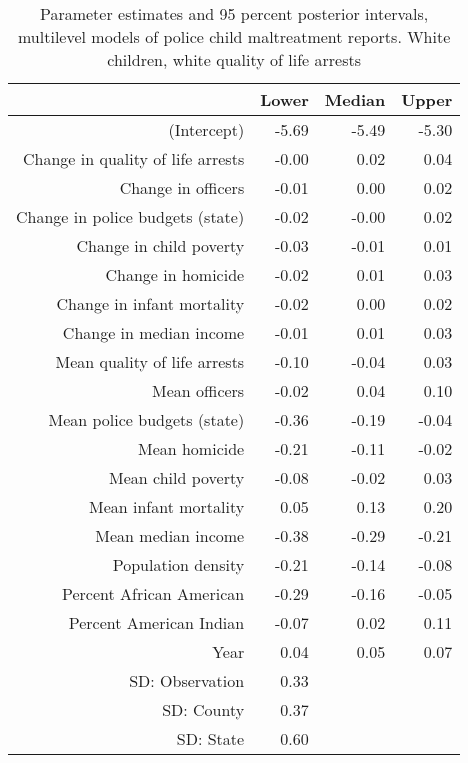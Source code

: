 \begin{table}[ht]
\centering
\begin{tabular}{rrrr}
  \hline
 & Lower & Median & Upper \\ 
  \hline
(Intercept) & -5.69 & -5.49 & -5.30 \\ 
  Change in quality of life arrests & -0.00 & 0.02 & 0.04 \\ 
  Change in officers & -0.01 & 0.00 & 0.02 \\ 
  Change in police budgets (state) & -0.02 & -0.00 & 0.02 \\ 
  Change in child poverty & -0.03 & -0.01 & 0.01 \\ 
  Change in homicide & -0.02 & 0.01 & 0.03 \\ 
  Change in infant mortality & -0.02 & 0.00 & 0.02 \\ 
  Change in median income & -0.01 & 0.01 & 0.03 \\ 
  Mean quality of life arrests & -0.10 & -0.04 & 0.03 \\ 
  Mean officers & -0.02 & 0.04 & 0.10 \\ 
  Mean police budgets (state) & -0.36 & -0.19 & -0.04 \\ 
  Mean homicide & -0.21 & -0.11 & -0.02 \\ 
  Mean child poverty & -0.08 & -0.02 & 0.03 \\ 
  Mean infant mortality & 0.05 & 0.13 & 0.20 \\ 
  Mean median income & -0.38 & -0.29 & -0.21 \\ 
  Population density & -0.21 & -0.14 & -0.08 \\ 
  Percent African American & -0.29 & -0.16 & -0.05 \\ 
  Percent American Indian & -0.07 & 0.02 & 0.11 \\ 
  Year & 0.04 & 0.05 & 0.07 \\ 
  SD: Observation & 0.33 &  &  \\ 
  SD: County & 0.37 &  &  \\ 
  SD: State & 0.60 &  &  \\ 
   \hline
\end{tabular}
\caption{Parameter estimates and 95 percent posterior intervals, multilevel models of 
             police child maltreatment reports. White children, white quality of life arrests} 
\end{table}
